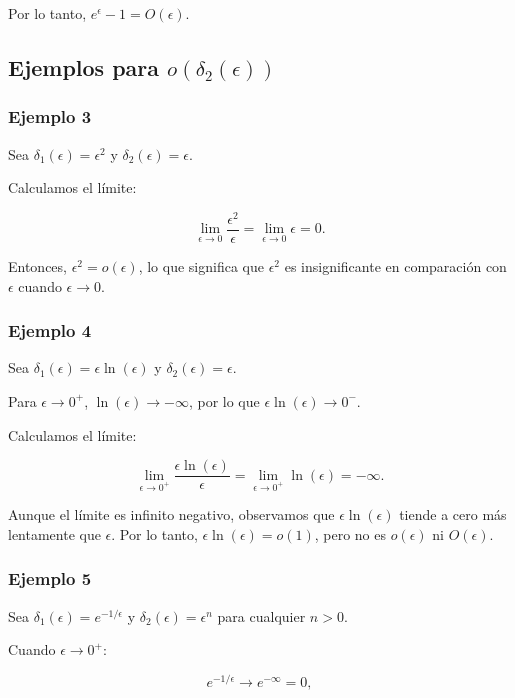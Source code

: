 \documentclass[12pt, a4paper]{report}
\begin{document}
Por lo tanto, \(e^\epsilon - 1 = O\left( \epsilon \right)\).

\subsection*{Ejemplos para \( o\left( \delta_2(\epsilon) \right) \)}

\subsubsection*{Ejemplo 3}

Sea \(\delta_1(\epsilon) = \epsilon^2\) y \(\delta_2(\epsilon) = \epsilon\).

Calculamos el límite:

\[
\lim_{\epsilon \to 0} \frac{\epsilon^2}{\epsilon} = \lim_{\epsilon \to 0} \epsilon = 0.
\]

Entonces, \(\epsilon^2 = o\left( \epsilon \right)\), lo que significa que \(\epsilon^2\) es insignificante en comparación con \(\epsilon\) cuando \(\epsilon \to 0\).

\subsubsection*{Ejemplo 4}

Sea \(\delta_1(\epsilon) = \epsilon \ln(\epsilon)\) y \(\delta_2(\epsilon) = \epsilon\).

Para \(\epsilon \to 0^+\), \(\ln(\epsilon) \to -\infty\), por lo que \(\epsilon \ln(\epsilon) \to 0^-\).

Calculamos el límite:

\[
\lim_{\epsilon \to 0^+} \frac{\epsilon \ln(\epsilon)}{\epsilon} = \lim_{\epsilon \to 0^+} \ln(\epsilon) = -\infty.
\]

Aunque el límite es infinito negativo, observamos que \(\epsilon \ln(\epsilon)\) tiende a cero más lentamente que \(\epsilon\). Por lo tanto, \(\epsilon \ln(\epsilon) = o(1)\), pero no es \(o\left( \epsilon \right)\) ni \(O\left( \epsilon \right)\).

\subsubsection*{Ejemplo 5}

Sea \(\delta_1(\epsilon) = e^{-1/\epsilon}\) y \(\delta_2(\epsilon) = \epsilon^n\) para cualquier \(n > 0\).

Cuando \(\epsilon \to 0^+\):

\[
e^{-1/\epsilon} \to e^{-\infty} = 0,
\]
\end{document}
